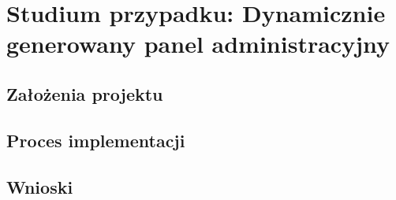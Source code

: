 \chapter[Studium przypadku: Dynamicznie generowany panel administracyjny]{Studium przypadku: Dynamicznie generowany panel administracyjny}
  \section{Założenia projektu}
  \section{Proces implementacji}
  \section{Wnioski}
